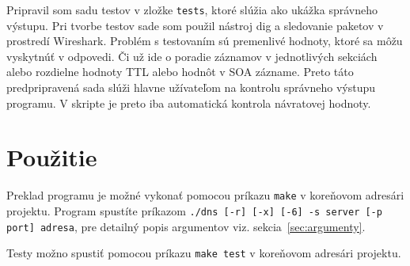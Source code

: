 Pripravil som sadu testov v zložke \texttt{tests}, ktoré slúžia ako ukážka správneho výstupu. Pri tvorbe testov sade som použil nástroj dig a sledovanie paketov v prostredí Wireshark. Problém s testovaním sú premenlivé hodnoty, ktoré sa môžu vyskytnúť v odpovedi. Či už ide o poradie záznamov v jednotlivých sekciách alebo rozdielne hodnoty TTL alebo hodnôt v SOA zázname. Preto táto predpripravená sada slúži hlavne užívateľom na kontrolu správneho výstupu programu. V skripte je preto iba automatická kontrola návratovej hodnoty.



\chapter{Použitie}
Preklad programu je možné vykonať pomocou príkazu \texttt{make} v koreňovom adresári projektu. Program spustíte príkazom \texttt{./dns [-r] [-x] [-6] -s server [-p port] adresa}, pre detailný popis argumentov viz. sekcia~\ref{sec:argumenty}.

Testy možno spustiť pomocou príkazu \texttt{make test} v koreňovom adresári projektu.